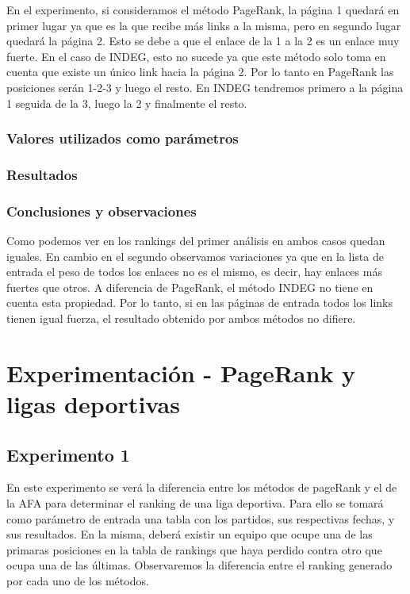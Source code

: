 		En el experimento, si consideramos el método PageRank, la página 1 quedará en primer lugar ya que es la que recibe más links a la misma, pero en segundo lugar quedará la página 2. Esto se debe a que el enlace de la 1 a la 2 es un enlace muy fuerte. En el caso de INDEG, esto no sucede ya que este método solo toma en cuenta que existe un único link hacia la página 2. Por lo tanto en PageRank las posiciones serán 1-2-3 y luego el resto. En INDEG tendremos primero a la página 1 seguida de la 3, luego la 2 y finalmente el resto.

		\subsubsection*{Valores utilizados como parámetros} 		

		\subsubsection*{Resultados}

		\subsubsection*{Conclusiones y observaciones} 
		Como podemos ver en los rankings del primer análisis en ambos casos quedan iguales. En cambio en el segundo observamos variaciones ya que en la lista de entrada el peso de todos los enlaces no es el mismo, es decir, hay enlaces más fuertes que otros. A diferencia de PageRank, el método INDEG no tiene en cuenta esta propiedad. Por lo tanto, si en las páginas de entrada todos los links tienen igual fuerza, el resultado obtenido por ambos métodos no difiere. 

\section{Experimentación - PageRank y ligas deportivas}
	

	\subsection{Experimento 1}
	En este experimento se verá la diferencia entre los métodos de pageRank y el de la AFA para determinar el ranking de una liga deportiva. Para ello se tomará como parámetro de entrada una tabla con los partidos, sus respectivas fechas, y sus resultados. En la misma, deberá existir un equipo que ocupe una de las primaras posiciones en la tabla de rankings que haya perdido contra otro que ocupa una de las últimas. Observaremos la diferencia entre el ranking generado por cada uno de los métodos.
		

